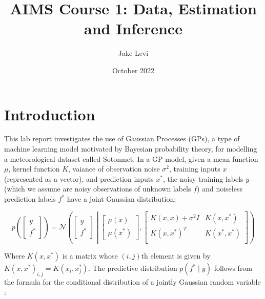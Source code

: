 \documentclass{article}
\title{AIMS Course 1: Data, Estimation and Inference}
\author{Jake Levi}
\date{October 2022}
\begin{document}
\maketitle


\section{Introduction} \label{section:intro}

This lab report investigates the use of Gaussian Processes (GPs), a type of machine learning model motivated by Bayesian probability theory, for modelling a meteorological dataset called Sotonmet. In a GP model, given a mean function $\mu$, kernel function $K$, vaiance of observation noise $\sigma^2$, training inputs $x$ (represented as a vector), and prediction inputs $x^*$, the noisy training labels $y$ (which we assume are noisy observations of unknown labels $f$) and noiseless prediction labels $f^*$ have a joint Gaussian distribution:


\begin{equation}
    p\left( \begin{bmatrix}
        y \\
        f^*
    \end{bmatrix} \right)
    = \mathcal{N} \left( \begin{bmatrix}
        y \\
        f^*
    \end{bmatrix} \middle| \begin{bmatrix}
        \mu(x) \\
        \mu(x^*)
    \end{bmatrix}, \begin{bmatrix}
        K(x, x) + \sigma^2 I & K(x, x^*) \\
        K(x, x^*)^T & K(x^*, x^*) \\
    \end{bmatrix} \right)
\end{equation}

Where $K(x, x^*)$ is a matrix whose $(i, j)$th element is given by $K(x, x^*)_{i,j} = K(x_i, x^*_j)$. The predictive distribution $p(f^* \mid y)$ follows from the formula for the conditional distribution of a jointly Gaussian random variable \cite{bishop2006pattern}:

\end{document}
